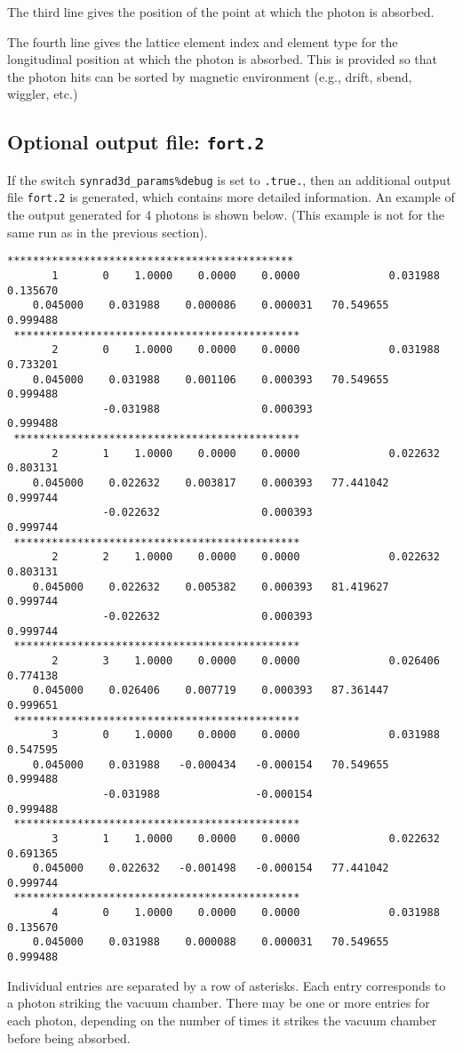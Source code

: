 \documentclass[11pt,landscape]{article}
\begin{document}
The third line gives the position of the point at which the photon is absorbed.

The fourth line gives the lattice element index and element type for
the longitudinal position at which the photon is absorbed. This is
provided so that the photon hits can be sorted by magnetic environment
(e.g., drift, sbend, wiggler, etc.)  


\subsection{Optional output file: \texttt{fort.2}} 


If the switch \texttt{synrad3d\_params\%debug} is set
to \texttt{.true.}, then an additional output file \texttt{fort.2} is
generated, which contains more detailed information. An example of the
output generated for 4 photons is shown below. (This example is not
for the same run as in the previous section).
\begin{verbatim}
*********************************************
       1       0    1.0000    0.0000    0.0000              0.031988    0.135670
    0.045000    0.031988    0.000086    0.000031   70.549655    0.999488
 *********************************************
       2       0    1.0000    0.0000    0.0000              0.031988    0.733201
    0.045000    0.031988    0.001106    0.000393   70.549655    0.999488
               -0.031988                0.000393                0.999488
 *********************************************
       2       1    1.0000    0.0000    0.0000              0.022632    0.803131
    0.045000    0.022632    0.003817    0.000393   77.441042    0.999744
               -0.022632                0.000393                0.999744
 *********************************************
       2       2    1.0000    0.0000    0.0000              0.022632    0.803131
    0.045000    0.022632    0.005382    0.000393   81.419627    0.999744
               -0.022632                0.000393                0.999744
 *********************************************
       2       3    1.0000    0.0000    0.0000              0.026406    0.774138
    0.045000    0.026406    0.007719    0.000393   87.361447    0.999651
 *********************************************
       3       0    1.0000    0.0000    0.0000              0.031988    0.547595
    0.045000    0.031988   -0.000434   -0.000154   70.549655    0.999488
               -0.031988               -0.000154                0.999488
 *********************************************
       3       1    1.0000    0.0000    0.0000              0.022632    0.691365
    0.045000    0.022632   -0.001498   -0.000154   77.441042    0.999744
 *********************************************
       4       0    1.0000    0.0000    0.0000              0.031988    0.135670
    0.045000    0.031988    0.000088    0.000031   70.549655    0.999488
\end{verbatim}
Individual entries are separated by a row of asterisks. Each entry
corresponds to a photon striking the vacuum chamber. There may be one
or more entries for each photon, depending on the number of times it
strikes the vacuum chamber before being absorbed.
\end{document}
